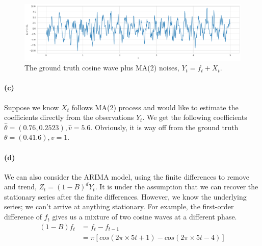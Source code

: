 \documentclass[11pt, letterpaper]{article}
\begin{document}
\begin{figure}[!h]
  \centering
  \includegraphics[width=1.0\textwidth]{plot2.png}
  \captionsetup{justification=centering}
  \caption{The ground truth cosine wave plus MA(2) noises, $Y_t = f_t + X_t$.}
  \label{fig:truth_plus_noise}
\end{figure}

\paragraph{(c)}
Suppose we know $X_t$ follows MA(2) process and would like to estimate the coefficients directly from the observations $Y_t$. We get the following coefficients $\hat{\theta}=(0.76, 0.2523), \hat{v}=5.6$. Obviously, it is way off from the ground truth $\theta = (0.4 1.6), v=1$.

\paragraph{(d)}
We can also consider the ARIMA model, using the finite differences to remove and trend, $Z_t = (1-B)^d Y_t$. It is under the assumption that we can recover the stationary series after the finite differences. However, we know the underlying series; we can't arrive at anything stationary. For example, the first-order difference of $f_t$ gives us a mixture of two cosine waves at a different phase.
\begin{align*}
    (1-B)f_t &= f_t - f_{t-1} \\
        &= \pi [cos(2\pi \times 5t + 1) - cos(2\pi \times 5t - 4)]
\end{align*}
\end{document}
